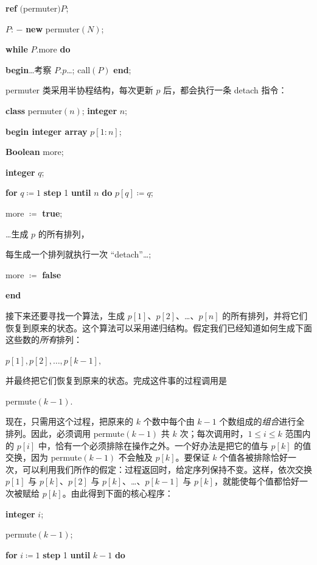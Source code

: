 \quad \textbf{ref} $($permuter$)P$;

\quad $P$: $-$ \textbf{new} permuter$(N)$;

\quad \textbf{while} $P$.more \textbf{do}

\quad \quad \textbf{begin}\dots 考察 $P.p$\dots; call$(P)$ \textbf{end};

\noindent
permuter 类采用半协程结构，每次更新 $p$ 后，都会执行一条 detach 指令：

\quad \textbf{class} permuter$(n)$; \textbf{integer} $n$;

\quad \quad \textbf{begin integer array} $p[1:n]$;

\quad \quad \quad \textbf{Boolean} more;

\quad \quad \quad \textbf{integer} $q$;

\quad \quad \quad \textbf{for} $q\coloneq 1$ \textbf{step} 1 \textbf{until} $n$ \textbf{do} $p[q]\coloneq q$;

\quad \quad \quad more $\coloneq$ \textbf{true};

\tabto*{3.3em} \dots 生成 $p$ 的所有排列，

\quad \quad \quad 每生成一个排列就执行一次 ``detach''\dots;

\quad \quad \quad more $\coloneq$ \textbf{false}

\quad \quad \textbf{end}

接下来还要寻找一个算法，生成 $p[1]$、$p[2]$、\dots、$p[n]$ 的所有排列，并将它们恢复到原来的状态。这个算法可以采用递归结构。假定我们已经知道如何生成下面这些数的\textit{所有}排列：

\quad $p[1], p[2], \dots, p[k - 1],$

\noindent
并最终把它们恢复到原来的状态。完成这件事的过程调用是

\quad permute$(k - 1)$.

\noindent
现在，只需用这个过程，把原来的 $k$ 个数中每个由 $k - 1$ 个数组成的\textit{组合}进行全排列。因此，必须调用 permute$(k - 1)$ 共 $k$ 次；每次调用时，$1 \leqslant i \leqslant k$ 范围内的 $p[i]$ 中，恰有一个必须排除在操作之外。一个好办法是把它的值与 $p[k]$ 的值交换，因为 permute$(k - 1)$ 不会触及 $p[k]$。要保证 $k$ 个值各被排除恰好一次，可以利用我们所作的假定：过程返回时，给定序列保持不变。这样，依次交换 $p[1]$ 与 $p[k]$、$p[2]$ 与 $p[k]$、\dots、$p[k - 1]$ 与 $p[k]$，就能使每个值都恰好一次被赋给 $p[k]$。由此得到下面的核心程序：

\quad \textbf{integer} $i$;

\quad permute$(k - 1)$;

\quad \textbf{for} $i\coloneq 1$ \textbf{step} 1 \textbf{until} $k - 1$ \textbf{do}

